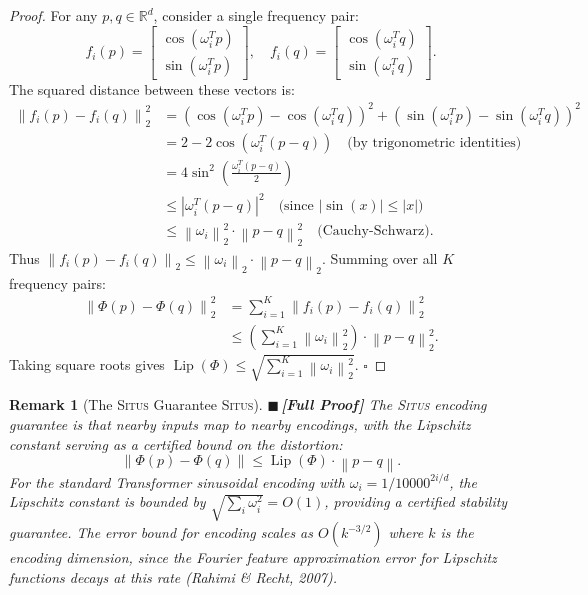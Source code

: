 \documentclass[12pt,a4paper]{article}
\newtheorem{remark}[theorem]{Remark}
\theoremstyle{definition}
\newcommand{\rigorFull}{{\color{rigorcolor}$\blacksquare$\,\textbf{[Full Proof]}}}
\newcommand{\Situs}{\textsc{Situs}}
\DeclareMathOperator{\Lip}{Lip}
\newcommand{\R}{\mathbb{R}}
\newcommand{\norm}[1]{\left\lVert#1\right\rVert}
\newcommand{\abs}[1]{\left|#1\right|}
\begin{document}
\begin{proof}
For any $p, q \in \R^d$, consider a single frequency pair:
\[
f_i(p) = \begin{bmatrix} \cos(\omega_i^T p) \\ \sin(\omega_i^T p) \end{bmatrix}, \quad
f_i(q) = \begin{bmatrix} \cos(\omega_i^T q) \\ \sin(\omega_i^T q) \end{bmatrix}.
\]
The squared distance between these vectors is:
\begin{align*}
    \norm{f_i(p) - f_i(q)}_2^2 &= (\cos(\omega_i^T p) - \cos(\omega_i^T q))^2 + (\sin(\omega_i^T p) - \sin(\omega_i^T q))^2 \\
    &= 2 - 2\cos(\omega_i^T(p-q)) \quad \text{(by trigonometric identities)} \\
    &= 4\sin^2\left(\frac{\omega_i^T(p-q)}{2}\right) \\
    &\leq \abs{\omega_i^T(p-q)}^2 \quad \text{(since } |\sin(x)| \leq |x| \text{)} \\
    &\leq \norm{\omega_i}_2^2 \cdot \norm{p - q}_2^2 \quad \text{(Cauchy-Schwarz)}.
\end{align*}
Thus $\norm{f_i(p) - f_i(q)}_2 \leq \norm{\omega_i}_2 \cdot \norm{p - q}_2$. Summing 
over all $K$ frequency pairs:
\begin{align*}
    \norm{\Phi(p) - \Phi(q)}_2^2 &= \sum_{i=1}^{K} \norm{f_i(p) - f_i(q)}_2^2 \\
    &\leq \left(\sum_{i=1}^{K} \norm{\omega_i}_2^2\right) \cdot \norm{p - q}_2^2.
\end{align*}
Taking square roots gives $\Lip(\Phi) \leq \sqrt{\sum_{i=1}^{K} \norm{\omega_i}_2^2}$. \hfill $\square$
\end{proof}

\begin{remark}[The \Situs{} Guarantee \Situs{}]\label{rem:situs_guarantee}
\rigorFull
The \Situs{} encoding guarantee is that nearby inputs map to nearby encodings, with the 
Lipschitz constant serving as a certified bound on the distortion:
\[
\norm{\Phi(p) - \Phi(q)} \leq \Lip(\Phi) \cdot \norm{p - q}.
\]
For the standard Transformer sinusoidal encoding with $\omega_i = 1/10000^{2i/d}$,
the Lipschitz constant is bounded by $\sqrt{\sum_i \omega_i^2} = O(1)$, providing a
certified stability guarantee. The error bound for encoding scales as $O(k^{-3/2})$
where $k$ is the encoding dimension, since the Fourier feature approximation error
for Lipschitz functions decays at this rate (Rahimi \& Recht, 2007).
\end{remark}
\end{document}
